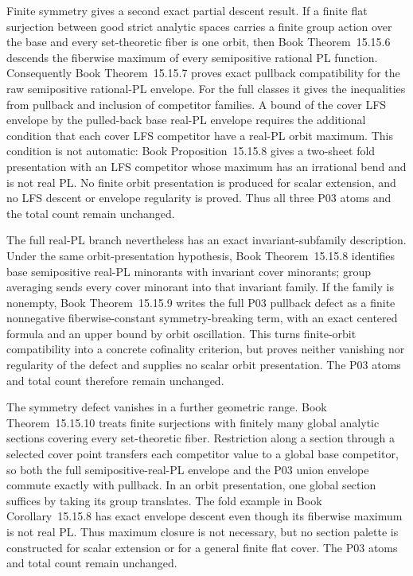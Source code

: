 \documentclass[11pt,a4paper]{article}
\theoremstyle{definition}
\theoremstyle{remark}
\begin{document}
Finite symmetry gives a second exact partial descent result.  If a finite
flat surjection between good strict analytic spaces carries a finite group
action over the base and every set-theoretic fiber is one orbit, then
Book Theorem~15.15.6 descends the fiberwise maximum of every
semipositive rational PL function.  Consequently
Book Theorem~15.15.7 proves exact pullback compatibility
for the raw semipositive rational-PL envelope. For the full classes it gives
the inequalities from pullback and inclusion of competitor families. A
bound of the cover LFS envelope by the pulled-back base real-PL envelope
requires the additional condition that each cover LFS competitor have a
real-PL orbit maximum. This condition is not automatic:
Book Proposition~15.15.8 gives a two-sheet fold
presentation with an LFS competitor whose maximum has an irrational bend
and is not real PL. No
finite orbit presentation is produced for scalar extension, and no LFS
descent or envelope regularity is proved.  Thus all three P03 atoms and the
total count remain unchanged.

The full real-PL branch nevertheless has an exact invariant-subfamily
description.  Under the same orbit-presentation hypothesis,
Book Theorem~15.15.8 identifies base semipositive real-PL
minorants with invariant cover minorants; group averaging sends every cover
minorant into that invariant family.  If the family is nonempty,
Book Theorem~15.15.9 writes the full P03 pullback defect
as a finite nonnegative fiberwise-constant symmetry-breaking term, with an
exact centered formula and an upper bound by orbit oscillation.  This turns
finite-orbit compatibility into a concrete cofinality criterion, but proves
neither vanishing nor regularity of the defect and supplies no scalar orbit
presentation.  The P03 atoms and total count therefore remain unchanged.

The symmetry defect vanishes in a further geometric range.
Book Theorem~15.15.10 treats finite surjections
with finitely many global analytic sections covering every set-theoretic
fiber.  Restriction along a section through a selected cover point transfers
each competitor value to a global base competitor, so both the full
semipositive-real-PL envelope and the P03 union envelope commute exactly with
pullback.  In an orbit presentation, one global section suffices by taking
its group translates.  The fold example in
Book Corollary~15.15.8 has exact envelope
descent even though its fiberwise maximum is not real PL.  Thus maximum
closure is not necessary, but no section palette is constructed for scalar
extension or for a general finite flat cover.  The P03 atoms and total count
remain unchanged.
\end{document}
